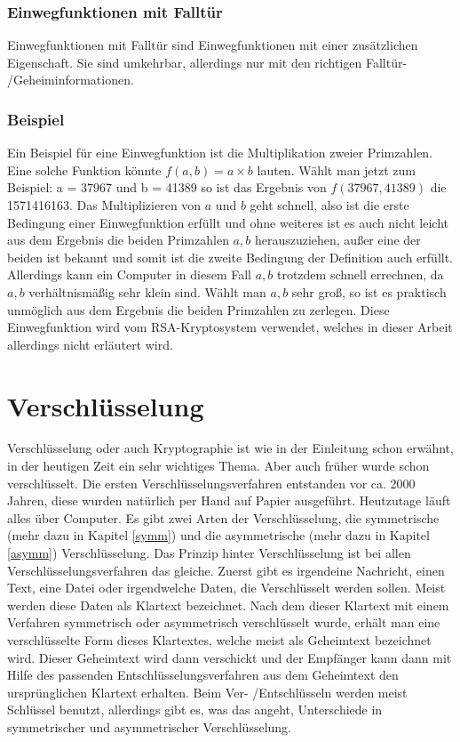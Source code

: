 \documentclass[a4paper,12pt,titlepage]{article}
\begin{document}
\subsubsection{Einwegfunktionen mit Falltür} \label{oneway_trapdoor}
Einwegfunktionen mit Falltür sind Einwegfunktionen mit einer zusätzlichen Eigenschaft. Sie sind umkehrbar, allerdings nur mit den richtigen Falltür- /Geheiminformationen.

\subsubsection{Beispiel}
Ein Beispiel für eine Einwegfunktion ist die Multiplikation zweier Primzahlen.
Eine solche Funktion könnte $f(a,b) = a \times b$ lauten. \newline Wählt man jetzt zum Beispiel: a = 37967 und b = 41389 so ist das Ergebnis von $f(37967, 41389)$ die 1571416163. Das Multiplizieren von $a$ und $b$ geht schnell, also ist die erste Bedingung einer Einwegfunktion erfüllt und ohne weiteres ist es auch nicht leicht aus dem Ergebnis die beiden Primzahlen $a,b$ herauszuziehen, außer eine der beiden ist bekannt und somit ist die zweite Bedingung der Definition auch erfüllt. Allerdings kann ein Computer in diesem Fall $a,b$ trotzdem schnell errechnen, da $a,b$ verhältnismäßig sehr klein sind. Wählt man $a,b$ sehr groß, so ist es praktisch unmöglich aus dem Ergebnis die beiden Primzahlen zu zerlegen. Diese Einwegfunktion wird vom RSA-Kryptosystem verwendet, welches in dieser Arbeit allerdings nicht erläutert wird.

\section{Verschlüsselung}
Verschlüsselung oder auch Kryptographie ist wie in der Einleitung schon erwähnt, in der heutigen Zeit ein sehr wichtiges Thema. Aber auch früher wurde schon verschlüsselt. Die ersten Verschlüsselungsverfahren entstanden vor ca. 2000 Jahren, diese wurden natürlich per Hand auf Papier ausgeführt. Heutzutage läuft alles über Computer. \newline Es gibt zwei Arten der Verschlüsselung, die symmetrische (mehr dazu in Kapitel \ref{symm}) und die asymmetrische (mehr dazu in Kapitel \ref{asymm}) Verschlüsselung. Das Prinzip hinter Verschlüsselung ist bei allen Verschlüsselungsverfahren das gleiche. Zuerst gibt es irgendeine Nachricht, einen Text, eine Datei oder irgendwelche Daten, die Verschlüsselt werden sollen. Meist werden diese Daten als Klartext bezeichnet. Nach dem dieser Klartext mit einem Verfahren symmetrisch oder asymmetrisch verschlüsselt wurde, erhält man eine verschlüsselte Form dieses Klartextes, welche meist als Geheimtext bezeichnet wird. Dieser Geheimtext wird dann verschickt und der Empfänger kann dann mit Hilfe des passenden Entschlüsselungsverfahren aus dem Geheimtext den ursprünglichen Klartext erhalten. Beim Ver- /Entschlüsseln werden meist Schlüssel benutzt, allerdings gibt es, was das angeht, Unterschiede in symmetrischer und asymmetrischer Verschlüsselung.
\end{document}
